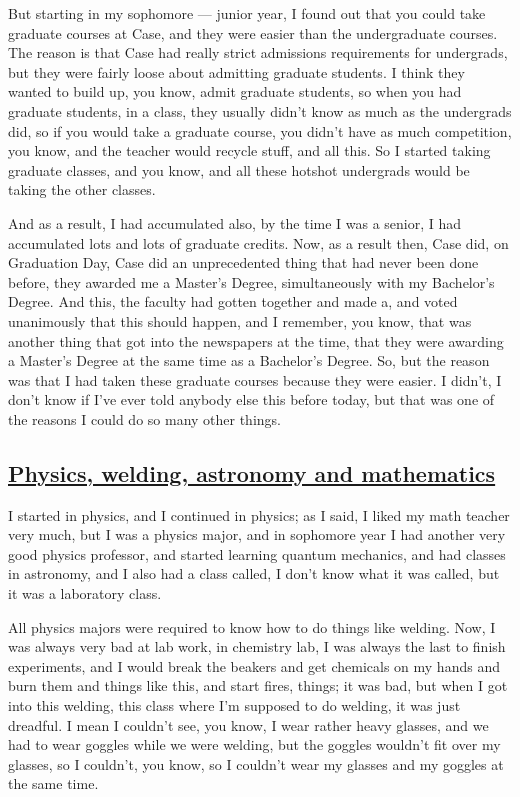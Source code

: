 \documentclass[]{article}
\begin{document}
But starting in my sophomore --- junior year, I found out that you could
take graduate courses at Case, and they were easier than the
undergraduate courses. The reason is that Case had really strict
admissions requirements for undergrads, but they were fairly loose about
admitting graduate students. I think they wanted to build up, you know,
admit graduate students, so when you had graduate students, in a class,
they usually didn't know as much as the undergrads did, so if you would
take a graduate course, you didn't have as much competition, you know,
and the teacher would recycle stuff, and all this. So I started taking
graduate classes, and you know, and all these hotshot undergrads would
be taking the other classes.

And as a result, I had accumulated also, by the time I was a senior, I
had accumulated lots and lots of graduate credits. Now, as a result
then, Case did, on Graduation Day, Case did an unprecedented thing that
had never been done before, they awarded me a Master's Degree,
simultaneously with my Bachelor's Degree. And this, the faculty had
gotten together and made a, and voted unanimously that this should
happen, and I remember, you know, that was another thing that got into
the newspapers at the time, that they were awarding a Master's Degree at
the same time as a Bachelor's Degree. So, but the reason was that I had
taken these graduate courses because they were easier. I didn't, I don't
know if I've ever told anybody else this before today, but that was one
of the reasons I could do so many other things.

\subsection{\texorpdfstring{\href{http://webofstories.com/play/17076}{Physics,
welding, astronomy and
mathematics}}{Physics, welding, astronomy and mathematics}}\label{physics-welding-astronomy-and-mathematics}

I started in physics, and I continued in physics; as I said, I liked my
math teacher very much, but I was a physics major, and in sophomore year
I had another very good physics professor, and started learning quantum
mechanics, and had classes in astronomy, and I also had a class called,
I don't know what it was called, but it was a laboratory class.

All physics majors were required to know how to do things like welding.
Now, I was always very bad at lab work, in chemistry lab, I was always
the last to finish experiments, and I would break the beakers and get
chemicals on my hands and burn them and things like this, and start
fires, things; it was bad, but when I got into this welding, this class
where I'm supposed to do welding, it was just dreadful. I mean I
couldn't see, you know, I wear rather heavy glasses, and we had to wear
goggles while we were welding, but the goggles wouldn't fit over my
glasses, so I couldn't, you know, so I couldn't wear my glasses and my
goggles at the same time.
\end{document}

